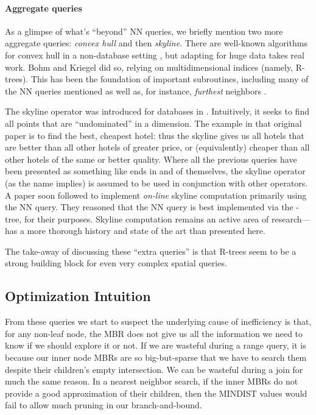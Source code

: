 \paragraph{Aggregate queries}
As a glimpse of what's ``beyond'' NN queries, we briefly mention two more aggregate queries: \emph{convex hull} and then \emph{skyline}.
There are well-known algorithms for convex hull in a non-database setting \cite{clrs3rd}, but adapting for huge data takes real work.
Bohm and Kriegel \cite{bohmkriegel01} did so, relying on multidimensional indices (namely, R-trees).
This has been the foundation of important subroutines, including many of the NN queries mentioned as well as, for instance, \emph{furthest} neighbors \cite{yaolikumar09}.

The skyline operator was introduced for databases in \cite{borzsonykossmannstocker01}.
Intuitively, it seeks to find all points that are ``undominated'' in a dimension.
The example in that original paper is to find the best, cheapest hotel: thus the skyline gives us all hotels that are better than all other hotels of greater price, or (equivalently) cheaper than all other hotels of the same or better quality.
Where all the previous queries have been presented as something like ends in and of themselves, the skyline operator (as the name implies) is assumed to be used in conjunction with other operators.
A paper soon followed to implement \emph{on-line} skyline computation primarily using the NN query\cite{kossmannramsakrost02}.
They reasoned that the NN query is best implemented via the \rstar-tree, for their purposes.
Skyline computation remains an active area of research---\cite{zhangalhajj10} has a more thorough history and state of the art than presented here.

The take-away of discussing these ``extra queries'' is that R-trees seem to be a strong building block for even very complex spatial queries.

\subsection{Optimization Intuition}

From these queries we start to suspect the underlying cause of inefficiency is that, for any non-leaf node, the MBR does not give us all the information we need to know if we should explore it or not.
If we are wasteful during a range query, it is because our inner node MBRs are so big-but-sparse that we have to search them despite their children's empty intersection.
We can be wasteful during a join for much the same reason.
In a nearest neighbor search, if the inner MBRs do not provide a good approximation of their children, then the MINDIST values would fail to allow much pruning in our branch-and-bound.

